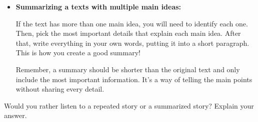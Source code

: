 \documentclass[12pt]{article}
\begin{document}
\vspace{1em}
\begin{tcolorbox}[colframe=black!40, colback=gray!5, 
coltitle=black, colbacktitle=black!20, fonttitle=\bfseries\Large, 
title=Additional Notes, halign title=center, left=5pt, right=5pt, top=5pt, bottom=15pt]

\begin{itemize}
    \item \textbf{Summarizing a texts with multiple main ideas:} 


If the text has more than one main idea, you will need to identify each one. Then, pick the most important details that explain each main idea. After that, write everything in your own words, putting it into a short paragraph. This is how you create a good summary!

Remember, a summary should be shorter than the original text and only include the most important information. It’s a way of telling the main points without sharing every detail.
\end{itemize}
\end{tcolorbox}
\begin{tcolorbox}[colframe=black!60, colback=white, 
coltitle=black, colbacktitle=black!15, fonttitle=\bfseries\Large, 
title=Exit Ticket, halign title=center, left=10pt, right=10pt, top=10pt, bottom=15pt]
Would you rather listen to a repeated story or a summarized story? Explain your answer.
\\[1cm] \underline{\hspace{15.6cm}} 
\\[1cm] \underline{\hspace{15.6cm}} \\[1cm]
\noindent \underline{\hspace{15.6cm}} \\[1cm]
\noindent \underline{\hspace{15.6cm}} \\[1cm]
\noindent \underline{\hspace{15.6cm}} \\[1cm]
\noindent \underline{\hspace{15.6cm}} \\[1cm]
\noindent \underline{\hspace{15.6cm}} \\[1cm]
\end{tcolorbox}
\end{document}
